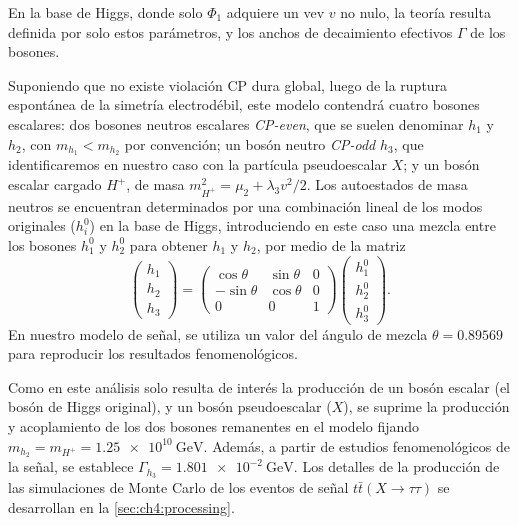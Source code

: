 En la base de Higgs, donde solo $\Phi_1$ adquiere un vev $v$ no nulo, la teoría resulta definida por solo estos parámetros, y los anchos de decaimiento efectivos $\Gamma$ de los bosones.

Suponiendo que no existe violación CP dura global, luego de la ruptura espontánea de la simetría electrodébil, este modelo contendrá cuatro bosones escalares: dos bosones neutros escalares \textit{CP-even}, que se suelen denominar $h_1$ y $h_2$, con $m_{h_1} < m_{h_2}$ por convención; un bosón neutro \textit{CP-odd} $h_3$, que identificaremos en nuestro caso con la partícula pseudoescalar $X$; y un bosón escalar cargado $H^+$, de masa $m_{H^+}^2 = \mu_2 + \lambda_3 v^2/2$. Los autoestados de masa neutros se encuentran determinados por una combinación lineal de los modos originales ($h_i^0$) en la base de Higgs, introduciendo en este caso una mezcla entre los bosones $h_1^0$ y $h_2^0$ para obtener $h_1$ y $h_2$, por medio de la matriz
\[
    \begin{pmatrix} h_1 \\ h_2 \\ h_3 \end{pmatrix}
    =
    \begin{pmatrix} \cos\theta & \sin\theta & 0 \\ -\sin\theta & \cos\theta & 0 \\ 0 & 0 & 1 \end{pmatrix}
    \begin{pmatrix} h^0_1 \\ h^0_2 \\ h^0_3 \end{pmatrix}.
\]
En nuestro modelo de señal, se utiliza un valor del ángulo de mezcla $\theta = 0.89569$ para reproducir los resultados fenomenológicos.

Como en este análisis solo resulta de interés la producción de un bosón escalar (el bosón de Higgs original), y un bosón pseudoescalar ($X$), se suprime la producción y acoplamiento de los dos bosones remanentes en el modelo fijando $m_{h_2} = m_{H^+} = \SI{1.25e10}{\GeV}$. Además, a partir de estudios fenomenológicos de la señal, se establece $\Gamma_{h_3} = \SI{1.801e-2}{\GeV}$. Los detalles de la producción de las simulaciones de Monte Carlo de los eventos de señal $t\bar{t}(X \to \tau\tau)$ se desarrollan en la \cref{sec:ch4:processing}.

\cleardoublepage{}